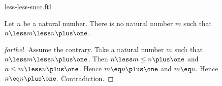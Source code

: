 \documentclass{stex}
\begin{document}
\begin{smodule}{less-less-succ.ftl}


\begin{proposition}[forthel,id=LessLessSuccProp]
  Let $n$ be a natural number.
  There is no natural number $m$ such that $n \less m \less n \plus \one$.
\end{proposition}
\begin{proof}[forthel]
  Assume the contrary.
  Take a natural number $m$ such that $n \less m \less n \plus \one$.
  Then $n \less m \leq n \plus \one$ and $n \leq m \less n \plus \one$.
  Hence $m \eq n \plus \one$ and $m \eq n$.
  Hence $n \eq n \plus \one$.
  Contradiction.
\end{proof}

\end{smodule}
\end{document}
